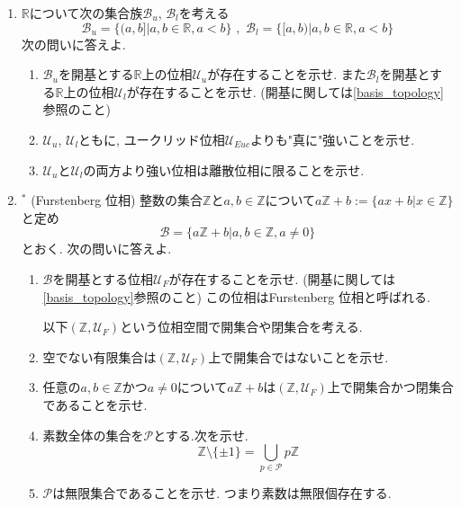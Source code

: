 \documentclass[dvipdfmx,a4paper,11pt]{article}
\newcommand{\R}{\mathbb{R}}
\newcommand{\Z}{\mathbb{Z}}
\theoremstyle{definition}
\begin{document}
\begin{enumerate}[label=\textbf{問}\ref*{sec-subspace}.\arabic*]
\item $\R$について次の集合族$\mathscr{B}_u$, $\mathscr{B}_l$を考える
$$
\mathscr{B}_u = \{(a,b]| a,b \in \R, a<b\} \,\,,\,\,
\mathscr{B}_l = \{[a,b)| a,b \in \R, a<b\}
$$
次の問いに答えよ.
	\begin{enumerate}
	\setlength{\parskip}{0cm} 
  \setlength{\itemsep}{0cm} 
	\item $\mathscr{B}_u $を開基とする$\R$上の位相$\mathscr{U}_u$が存在することを示せ. %
	また$\mathscr{B}_l$を開基とする$\R$上の位相$\mathscr{U}_l$が存在することを示せ. (開基に関しては\ref{basis_topology}参照のこと)
	\item $\mathscr{U}_u$, $\mathscr{U}_l$ともに, ユークリッド位相$\mathscr{U}_{Euc}$よりも"真に"強いことを示せ. 
	\item $\mathscr{U}_u$と$\mathscr{U}_l$の両方より強い位相は離散位相に限ることを示せ.
	\end{enumerate}



\item\label{Furstenberg} $^{*}$ (Furstenberg 位相) 整数の集合$\Z$と$a,b \in \Z$について$
a\Z + b := \{ ax + b | x \in \Z\}$と定め
$$
\mathscr{B} = \{ a\Z + b | a,b\in \Z, a \neq 0 \} 
$$
とおく. 次の問いに答えよ. 
	\begin{enumerate}
	\setlength{\parskip}{0cm} 
  \setlength{\itemsep}{0cm} 
	\item $\mathscr{B}$を開基とする位相$\mathscr{U}_F$が存在することを示せ. (開基に関しては\ref{basis_topology}参照のこと) この位相はFurstenberg 位相と呼ばれる. 
	
\hspace{-22pt}以下$(\Z,\mathscr{U}_F)$という位相空間で開集合や閉集合を考える. 
	\item 空でない有限集合は$(\Z, \mathscr{U}_F)$上で開集合ではないことを示せ. 
	\item 任意の$a,b \in \Z$かつ$a \neq 0$について$a\Z + b$は$(\Z, \mathscr{U}_F)$上で開集合かつ閉集合であることを示せ.
	\item 素数全体の集合を$\mathcal{P}$とする.次を示せ. 
	$$\Z \setminus \{ \pm 1\} = \bigcup_{p \in \mathcal{P}} p\Z$$
	\item $\mathcal{P}$は無限集合であることを示せ. つまり素数は無限個存在する.
	\end{enumerate}







\end{enumerate}
\end{document}
